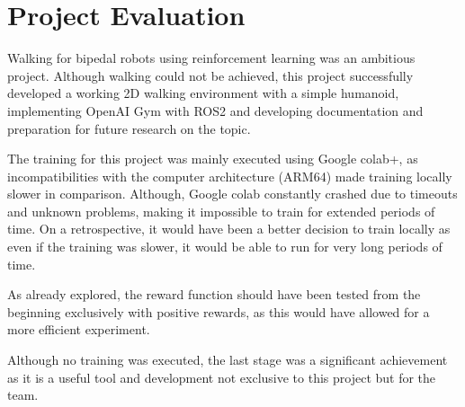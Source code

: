 \chapter{Project Evaluation}
Walking for bipedal robots using reinforcement learning was an ambitious project. Although walking could not be achieved, this project successfully developed a working 2D walking environment with a simple humanoid, implementing OpenAI Gym with ROS2 and developing documentation and preparation for future research on the topic.

The training for this project was mainly executed using Google colab+, as incompatibilities with the computer architecture (ARM64) made training locally slower in comparison. Although, Google colab constantly crashed due to timeouts and unknown problems, making it impossible to train for extended periods of time. 
On a retrospective, it would have been a better decision to train locally as even if the training was slower, it would be able to run for very long periods of time.

As already explored, the reward function should have been tested from the beginning exclusively with positive rewards, as this would have allowed for a more efficient experiment.



Although no training was executed, the last stage was a significant achievement as it is a useful tool and development not exclusive to this project but for the team. 
